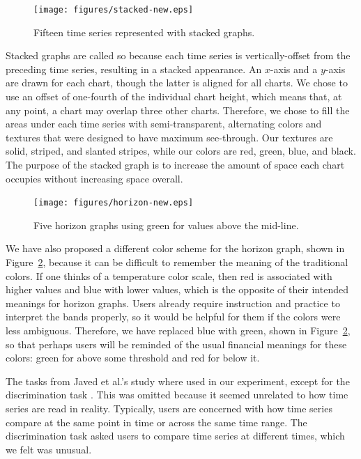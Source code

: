 \documentclass{article}
\begin{document}
\begin{figure}[h]
	\centering
	\texttt{[image: figures/stacked-new.eps]}
	\caption{Fifteen time series represented with stacked graphs.}
	\label{fig:stackedGraph}
\end{figure}

Stacked graphs are called so because each time series is vertically-offset from the preceding time series, resulting in a stacked appearance.  An $x$-axis and a $y$-axis are drawn for each chart, though the latter is aligned for all charts.  We chose to use an offset of one-fourth of the individual chart height, which means that, at any point, a chart may overlap three other charts.  Therefore, we chose to fill the areas under each time series with semi-transparent, alternating colors and textures that were designed to have maximum see-through.  Our textures are solid, striped, and slanted stripes, while our colors are red, green, blue, and black. The purpose of the stacked graph is to increase the amount of space each chart occupies without increasing space overall.

\begin{figure}[h]
	\centering
	\texttt{[image: figures/horizon-new.eps]}
	\caption{Five horizon graphs using green for values above the mid-line.}
	\label{fig:newHorizon}
\end{figure}

We have also proposed a different color scheme for the horizon graph, shown in Figure~\ref{fig:newHorizon}, because it can be difficult to remember the meaning of the traditional colors.  If one thinks of a temperature color scale, then red is associated with higher values and blue with lower values, which is the opposite of their intended meanings for horizon graphs.  Users already require instruction and practice to interpret the bands properly, so it would be helpful for them if the colors were less ambiguous.  Therefore, we have replaced blue with green, shown in Figure~\ref{fig:newHorizon}, so that perhaps users will be reminded of the usual financial meanings for these colors: green for above some threshold and red for below it.

The tasks from Javed et al.'s study where used in our experiment, except for the discrimination task \cite{javed2010}.  This was omitted because it seemed unrelated to how time series are read in reality.  Typically, users are concerned with how time series compare at the same point in time or across the same time range.  The discrimination task asked users to compare time series at different times, which we felt was unusual.
\end{document}
